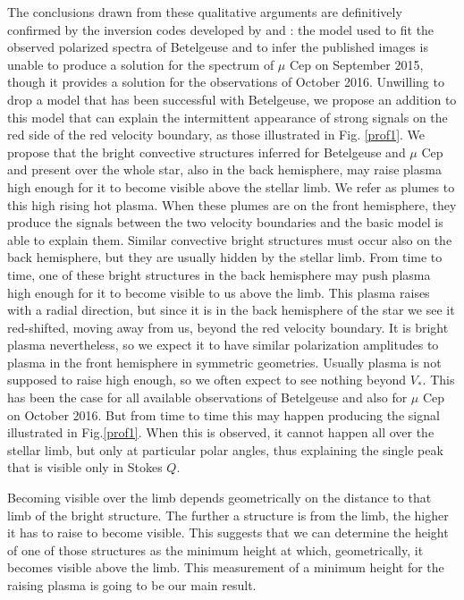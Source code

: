 \documentclass{/Users/art2/TeX/aanda/aa}
\begin{document}
The conclusions drawn from  these qualitative arguments are definitively confirmed by the inversion codes developed by \cite{LA18} and \cite{LA22}: the model used to fit the observed polarized spectra of Betelgeuse 
and to infer the published images is unable to produce a solution for the spectrum of $\mu$ Cep on September 2015, though it provides a solution for the observations of October 2016. Unwilling to drop a model that has been successful with Betelgeuse, we propose an addition to this model that can explain the intermittent appearance of strong signals on the red side of the red velocity boundary, as those illustrated in Fig. \ref{prof1}. We propose that the bright convective structures inferred for Betelgeuse and $\mu$ Cep and present over the whole star, also in the back hemisphere,  may raise plasma high enough for it to become visible above the stellar limb. We refer as plumes to this high rising hot plasma.
When these plumes are on the front hemisphere, they produce the signals between the two velocity boundaries and the basic model is able to explain them. Similar convective bright structures must occur also on the back hemisphere, but they are usually hidden by the stellar limb. From time to time, one of these bright structures in the back hemisphere may push plasma high enough for it to become visible to us above the limb. This plasma raises with a radial direction, but since it is in the back hemisphere of the star we see it red-shifted, moving away from us, beyond the red velocity boundary. It is bright plasma nevertheless, so we expect it to have similar polarization amplitudes to plasma in the front hemisphere in symmetric geometries. Usually plasma is not supposed to raise high enough, so we often expect to see nothing beyond $V_*$. This has been the case for all available observations of Betelgeuse and also for $\mu$ Cep on October 2016. But from time to time this may happen producing the signal illustrated in Fig.\ref{prof1}.  When this is observed, it cannot happen all over the stellar limb, but only at particular polar angles, thus explaining the single peak that is visible only in Stokes $Q$.    

Becoming visible over the limb depends geometrically on the distance to that limb of the bright structure.  The further a structure is from the limb, the higher it has to raise to become visible.  This suggests that we can determine the height of one of those structures as the minimum height at which, geometrically, it becomes visible above the limb.  This measurement of a minimum height for the raising plasma is going to be our main result. 
\end{document}
